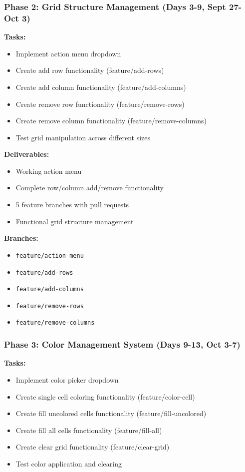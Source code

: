 \documentclass[11pt,a4paper]{article}
\begin{document}
\subsubsection{Phase 2: Grid Structure Management (Days 3-9, Sept 27-Oct 3)}
\textbf{Tasks:}
\begin{itemize}[leftmargin=*]
    \item Implement action menu dropdown
    \item Create add row functionality (feature/add-rows)
    \item Create add column functionality (feature/add-columns)
    \item Create remove row functionality (feature/remove-rows)
    \item Create remove column functionality (feature/remove-columns)
    \item Test grid manipulation across different sizes
\end{itemize}

\textbf{Deliverables:}
\begin{itemize}[leftmargin=*]
    \item Working action menu
    \item Complete row/column add/remove functionality
    \item 5 feature branches with pull requests
    \item Functional grid structure management
\end{itemize}

\textbf{Branches:}
\begin{itemize}[leftmargin=*]
    \item \texttt{feature/action-menu}
    \item \texttt{feature/add-rows}
    \item \texttt{feature/add-columns}
    \item \texttt{feature/remove-rows}
    \item \texttt{feature/remove-columns}
\end{itemize}

\subsubsection{Phase 3: Color Management System (Days 9-13, Oct 3-7)}
\textbf{Tasks:}
\begin{itemize}[leftmargin=*]
    \item Implement color picker dropdown
    \item Create single cell coloring functionality (feature/color-cell)
    \item Create fill uncolored cells functionality (feature/fill-uncolored)
    \item Create fill all cells functionality (feature/fill-all)
    \item Create clear grid functionality (feature/clear-grid)
    \item Test color application and clearing
\end{itemize}
\end{document}
